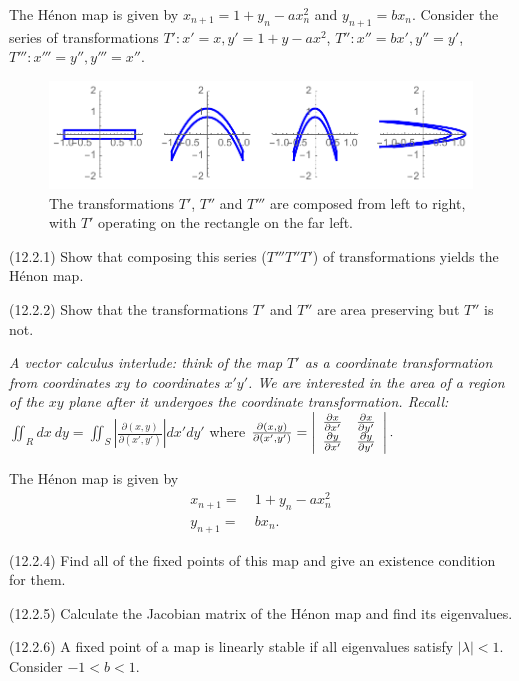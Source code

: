 \documentclass[12pt,letterpaper,noanswers]{exam}
\begin{document}
\begin{questions}
\item The H\'enon map is given by $x_{n+1} = 1 + y_n - a x_n^2$ and $y_{n+1} = b x_n$.  Consider the series of transformations
$T': x' = x, y' = 1 + y - a x^2$, 
$T'': x'' = b x', y'' = y'$, 
$T''': x''' = y'', y''' = x''.$  
\begin{figure}[h]
\includegraphics{img/C25Henon.pdf}
\caption{The transformations $T'$, $T''$ and $T'''$ are composed from left to right, with $T'$ operating on the rectangle on the far left.}
\end{figure}
\begin{parts}
\item (12.2.1) Show that composing this series ($T''' T'' T'$) of transformations yields the H\'enon map.
\item (12.2.2) Show that the transformations $T'$ and $T''$ are area preserving but $T''$ is not.

\textit{A vector calculus interlude: think of the map $T'$ as a coordinate transformation from coordinates $xy$ to coordinates $x'y'$.  
We are interested in the area of a region of the $xy$ plane after it undergoes the coordinate transformation.  Recall:
$\iint_R dx\ dy = \iint_S \left\vert \frac{\partial(x,y)}{\partial(x',y')}\right\vert dx'dy'$} where $ \frac{\partial(x,y)}{\partial(x',y')} =
\left\vert \begin{array}{ c c} \frac{\partial x}{\partial x'} & \frac{\partial x}{\partial y'} \\ \frac{\partial y}{\partial x'} & \frac{\partial y}{\partial y'} \end{array} \right\vert.$
\end{parts}

\item The H\'enon map is given by 
\begin{align*}
x_{n+1} = &\ 1 + y_n - a x_n^2 \\
y_{n+1} = &\ b x_n.
\end{align*}
\begin{parts}
\item (12.2.4) Find all of the fixed points of this map and give an existence condition for them.
\item (12.2.5) Calculate the Jacobian matrix of the Hénon map and find its eigenvalues.  
\item (12.2.6) A fixed point of a map is linearly stable if all eigenvalues satisfy $\vert \lambda \vert < 1$.  Consider $-1 <  b < 1$.


\end{parts}
\end{questions}
\end{document}
